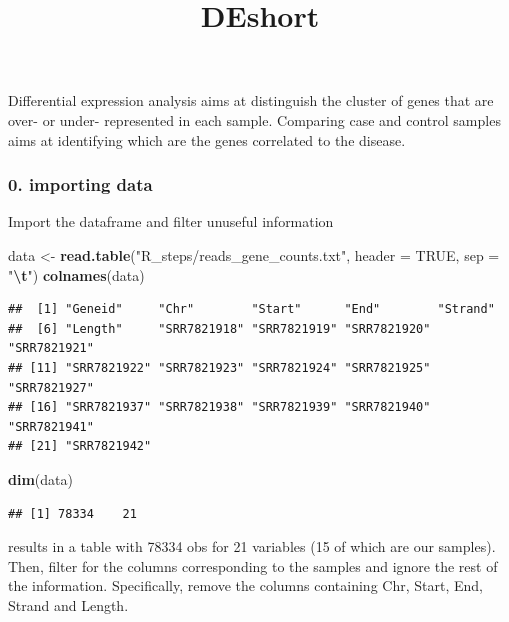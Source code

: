 \documentclass[
]{article}
\title{DEshort}
\author{}
\date{\vspace{-2.5em}}
\newenvironment{Shaded}{\begin{snugshade}}{\end{snugshade}}
\newcommand{\AttributeTok}[1]{\textcolor[rgb]{0.13,0.29,0.53}{#1}}
\newcommand{\ConstantTok}[1]{\textcolor[rgb]{0.56,0.35,0.01}{#1}}
\newcommand{\FunctionTok}[1]{\textcolor[rgb]{0.13,0.29,0.53}{\textbf{#1}}}
\newcommand{\NormalTok}[1]{#1}
\newcommand{\OtherTok}[1]{\textcolor[rgb]{0.56,0.35,0.01}{#1}}
\newcommand{\SpecialCharTok}[1]{\textcolor[rgb]{0.81,0.36,0.00}{\textbf{#1}}}
\newcommand{\StringTok}[1]{\textcolor[rgb]{0.31,0.60,0.02}{#1}}
\begin{document}
\maketitle

Differential expression analysis aims at distinguish the cluster of
genes that are over- or under- represented in each sample. Comparing
case and control samples aims at identifying which are the genes
correlated to the disease.

\subsubsection{0. importing data}\label{importing-data}

Import the dataframe and filter unuseful information

\begin{Shaded}
\begin{Highlighting}[]
\NormalTok{data }\OtherTok{\textless{}{-}} \FunctionTok{read.table}\NormalTok{(}\StringTok{"R\_steps/reads\_gene\_counts.txt"}\NormalTok{, }
                   \AttributeTok{header =} \ConstantTok{TRUE}\NormalTok{, }
                   \AttributeTok{sep =} \StringTok{"}\SpecialCharTok{\textbackslash{}t}\StringTok{"}\NormalTok{)}
\FunctionTok{colnames}\NormalTok{(data)}
\end{Highlighting}
\end{Shaded}

\begin{verbatim}
##  [1] "Geneid"     "Chr"        "Start"      "End"        "Strand"    
##  [6] "Length"     "SRR7821918" "SRR7821919" "SRR7821920" "SRR7821921"
## [11] "SRR7821922" "SRR7821923" "SRR7821924" "SRR7821925" "SRR7821927"
## [16] "SRR7821937" "SRR7821938" "SRR7821939" "SRR7821940" "SRR7821941"
## [21] "SRR7821942"
\end{verbatim}

\begin{Shaded}
\begin{Highlighting}[]
\FunctionTok{dim}\NormalTok{(data)}
\end{Highlighting}
\end{Shaded}

\begin{verbatim}
## [1] 78334    21
\end{verbatim}

results in a table with 78334 obs for 21 variables (15 of which are our
samples). Then, filter for the columns corresponding to the samples and
ignore the rest of the information. Specifically, remove the columns
containing Chr, Start, End, Strand and Length.
\end{document}
